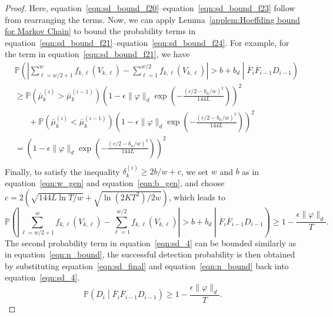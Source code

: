 \documentclass[twoside]{article}
\def\eqref#1{equation~\ref{#1}}
\theoremstyle{plain}
\theoremstyle{definition}
\theoremstyle{remark}
\begin{document}
\begin{proof}
Here, \eqref{eqn:sd_bound_f20}--\eqref{eqn:sd_bound_f23} follow from rearranging the terms.
Now, we can apply Lemma~\ref{applem:Hoeffding bound for Markov Chain} to bound the probability terms in \eqref{eqn:sd_bound_f21}--\eqref{eqn:sd_bound_f24}. For example, for the term in \eqref{eqn:sd_bound_f21}, we have
\begin{subequations}
    \begin{align}
        &\mathbb{P}\left(\left\lvert\sum^{w}_{\ell=w/2+1}f_{k,\ell}\left(V_{k,\ell}\right)-\sum^{w/2}_{\ell=1}f_{k,\ell}\left(V_{k,\ell}\right)\right\rvert > b + b_d \middle| \overline{F}_{i}\overline{F}_{i-1} D_{i-1}\right)\label{eqn:sd_bound_f25}\\
        &\geq \mathbb{P}\left(\bar{\mu}^{(i)}_{k}>\bar{\mu}^{(i-1)}_{k}\right)\left(1-\epsilon \lVert \varphi \rVert_{d}\exp\left(-\frac{\left(c/2-b_{n}/w\right)^{2}}{144L}\right)\right)^2\label{eqn:sd_bound_f26}\\
        &\hspace{20pt} + \mathbb{P}\left(\bar{\mu}^{(i)}_{k}<\bar{\mu}^{(i-1)}_{k}\right)\left(1-\epsilon \lVert \varphi \rVert_{d}\exp\left(-\frac{\left(c/2-b_{n}/w\right)^{2}}{144L}\right)\right)^2\label{eqn:sd_bound_f27}\\
        &= \left(1-\epsilon \lVert \varphi \rVert_{d}\exp\left(-\frac{\left(c/2-b_{n}/w\right)^{2}}{144L}\right)\right)^2\label{eqn:sd_bound_f28}\\
    \end{align}
\end{subequations}
Finally, to satisfy the inequality $\delta^{(i)}_{k} \ge 2b/w + c$, we set $w$ and $b$ as in \eqref{eqn:w_gen} and \eqref{eqn:b_gen}, and choose $c = 2\left(\sqrt{144L\ln T/w} + \sqrt{\ln(2KT^2)/2w}\right)$, which leads to 
\begin{equation}
    \mathbb{P}\left(\left\lvert\sum^{w}_{\ell=w/2+1}f_{k,\ell}\left(V_{k,\ell}\right)-\sum^{w/2}_{\ell=1}f_{k,\ell}\left(V_{k,\ell}\right)\right\rvert > b + b_d \middle| \overline{F}_{i}\overline{F}_{i-1} D_{i-1}\right)\geq 1 - \frac{\epsilon \lVert \varphi \rVert_{d}}{T}.\label{eqn:sd_final}
\end{equation}
The second probability term in \eqref{eqn:sd_4} can be bounded similarly as in \eqref{eqn:n_bound}, the successful detection probability is then obtained by substituting \eqref{eqn:sd_final} and \eqref{eqn:n_bound} back into \eqref{eqn:sd_4}.
\begin{equation}
    \mathbb{P}\left(D_i \middle| \overline{F}_{i}\overline{F}_{i-1} D_{i-1}\right) \geq 1 - \frac{\epsilon \lVert \varphi \rVert_{d}}{T}.\label{eqn:sd_final_2}
\end{equation}

\end{proof}
\end{document}
